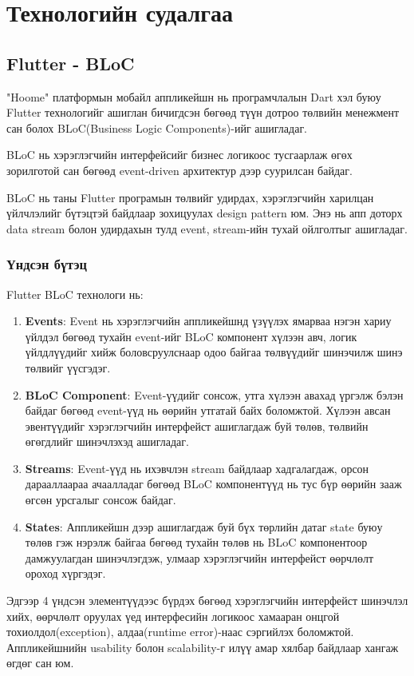\chapter{Технологийн судалгаа}
\section{Flutter - BLoC}
"Hoome" платформын мобайл аппликейшн нь програмчлалын Dart хэл буюу Flutter технологийг ашиглан бичигдсэн бөгөөд түүн дотроо төлвийн менежмент сан болох BLoC(Business Logic Components)-ийг ашигладаг. 

\cite{whybloc}BLoC нь хэрэглэгчийн интерфейсийг бизнес логикоос тусгаарлаж өгөх зорилготой сан бөгөөд event-driven архитектур дээр суурилсан байдаг. 

 BLoC нь таны Flutter програмын төлвийг удирдах, хэрэглэгчийн харилцан үйлчлэлийг бүтэцтэй байдлаар зохицуулах design pattern юм. Энэ нь апп доторх data stream болон удирдахын тулд event, stream-ийн тухай ойлголтыг ашигладаг.

\subsection{Үндсэн бүтэц}

Flutter BLoC технологи нь:

\begin{enumerate}
  \item \textbf{Events}: Event нь хэрэглэгчийн аппликейшнд үзүүлэх ямарваа нэгэн хариу үйлдэл бөгөөд тухайн event-ийг BLoC компонент хүлээн авч, логик үйлдлүүдийг хийж боловсруулснаар одоо байгаа төлвүүдийг шинэчилж шинэ төлвийг үүсгэдэг.
  \item \textbf{BLoC Component}: Event-үүдийг сонсож, утга хүлээн авахад үргэлж бэлэн байдаг бөгөөд event-үүд нь өөрийн утгатай байх боломжтой. Хүлээн авсан эвентүүдийг хэрэглэгчийн интерфейст ашиглагдаж буй төлөв, төлвийн өгөгдлийг шинэчлэхэд ашигладаг.
  \item \textbf{Streams}: Event-үүд нь ихэвчлэн stream байдлаар хадгалагдаж, орсон дарааллаараа ачаалладаг бөгөөд BLoC компонентүүд нь тус бүр өөрийн зааж өгсөн урсгалыг сонсож байдаг.
  \item \textbf{States}: Аппликейшн дээр ашиглагдаж буй бүх төрлийн датаг state буюу төлөв гэж нэрэлж байгаа бөгөөд тухайн төлөв нь BLoC компонентоор дамжуулагдан шинэчлэгдэж, улмаар хэрэглэгчийн интерфейст өөрчлөлт ороход хүргэдэг. 
\end{enumerate}

Эдгээр 4 үндсэн элементүүдээс бүрдэх бөгөөд хэрэглэгчийн интерфейст шинэчлэл хийх, өөрчлөлт оруулах үед интерфесийн логикоос хамааран онцгой тохиолдол(exception), алдаа(runtime error)-наас сэргийлэх боломжтой. Аппликейшнийн usability болон scalability-г илүү амар хялбар байдлаар хангаж өгдөг сан юм. 

